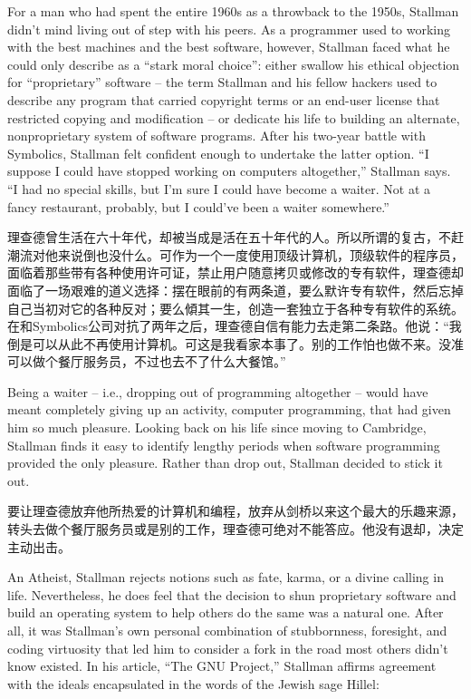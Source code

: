 \ifdefined\eng
For a man who had spent the entire 1960s as a throwback to the 1950s, Stallman didn't mind living out of step with his peers. As a programmer used to working with the best machines and the best software, however, Stallman faced what he could only describe as a ``stark moral choice'': either swallow his ethical objection for ``proprietary'' software -- the term Stallman and his fellow hackers used to describe any program that carried copyright terms or an end-user license that restricted copying and modification -- or dedicate his life to building an alternate, nonproprietary system of software programs. After his two-year battle with Symbolics, Stallman felt confident enough to undertake the latter option. ``I suppose I could have stopped working on computers altogether,'' Stallman says. ``I had no special skills, but I'm sure I could have become a waiter. Not at a fancy restaurant, probably, but I could've been a waiter somewhere.''
\fi

\ifdefined\chs
理查德曾生活在六十年代，却被当成是活在五十年代的人。所以所谓的复古，不赶潮流对他来说倒也没什么。可作为一个一度使用顶级计算机，顶级软件的程序员，面临着那些带有各种使用许可证，禁止用户随意拷贝或修改的专有软件，理查德却面临了一场艰难的道义选择：摆在眼前的有两条道，要么默许专有软件，然后忘掉自己当初对它的各种反对；要么傾其一生，创造一套独立于各种专有软件的系统。在和Symbolics公司对抗了两年之后，理查德自信有能力去走第二条路。他说：“我倒是可以从此不再使用计算机。可这是我看家本事了。别的工作怕也做不来。没准可以做个餐厅服务员，不过也去不了什么大餐馆。”
\fi

\ifdefined\eng
Being a waiter -- i.e., dropping out of programming altogether -- would have meant completely giving up an activity, computer programming, that had given him so much pleasure. Looking back on his life since moving to Cambridge, Stallman finds it easy to identify lengthy periods when software programming provided the only pleasure. Rather than drop out, Stallman decided to stick it out.
\fi

\ifdefined\chs
要让理查德放弃他所热爱的计算机和编程，放弃从剑桥以来这个最大的乐趣来源，转头去做个餐厅服务员或是别的工作，理查德可绝对不能答应。他没有退却，决定主动出击。
\fi

\ifdefined\eng
An Atheist, Stallman rejects notions such as fate, karma, or a divine calling in life. Nevertheless, he does feel that the decision to shun proprietary software and build an operating system to help others do the same was a natural one. After all, it was Stallman's own personal combination of stubbornness, foresight, and coding virtuosity that led him to consider a fork in the road most others didn't know existed. In his article, ``The GNU Project,'' Stallman affirms agreement with the ideals encapsulated in the words of the Jewish sage Hillel:
\fi

